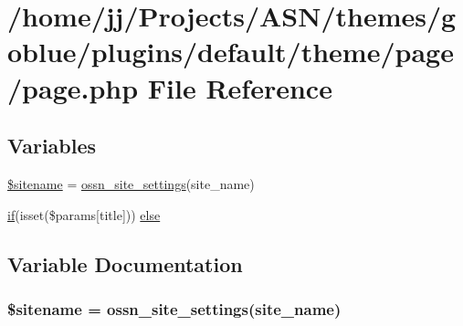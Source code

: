 \hypertarget{themes_2goblue_2plugins_2default_2theme_2page_2page_8php}{}\section{/home/jj/\+Projects/\+A\+S\+N/themes/goblue/plugins/default/theme/page/page.php File Reference}
\label{themes_2goblue_2plugins_2default_2theme_2page_2page_8php}
\subsection*{Variables}
\begin{DoxyCompactItemize}
\item 
\hyperlink{themes_2goblue_2plugins_2default_2theme_2page_2page_8php_ac01e858d3012ea85184c30f6f4edd45f}{\$sitename} = \hyperlink{ossn_8lib_8system_8php_a610e2045b8a86c09f777b4d82e24e34c}{ossn\+\_\+site\+\_\+settings}(\textquotesingle{}site\+\_\+name\textquotesingle{})
\item 
\hyperlink{jquery_8tokeninput_8js_ad8dd46a3cbc004569e34401e9e71771a}{if}(isset(\$params\mbox{[}\textquotesingle{}title\textquotesingle{}\mbox{]})) \hyperlink{themes_2goblue_2plugins_2default_2theme_2page_2page_8php_ae0388a3b2d3bf8304fcd2f91d5783299}{else}
\end{DoxyCompactItemize}


\subsection{Variable Documentation}
\subsubsection[{\texorpdfstring{\$sitename}{$sitename}}]{\setlength{\rightskip}{0pt plus 5cm}\$sitename = {\bf ossn\+\_\+site\+\_\+settings}(\textquotesingle{}site\+\_\+name\textquotesingle{})}\hypertarget{themes_2goblue_2plugins_2default_2theme_2page_2page_8php_ac01e858d3012ea85184c30f6f4edd45f}{}\label{themes_2goblue_2plugins_2default_2theme_2page_2page_8php_ac01e858d3012ea85184c30f6f4edd45f}


